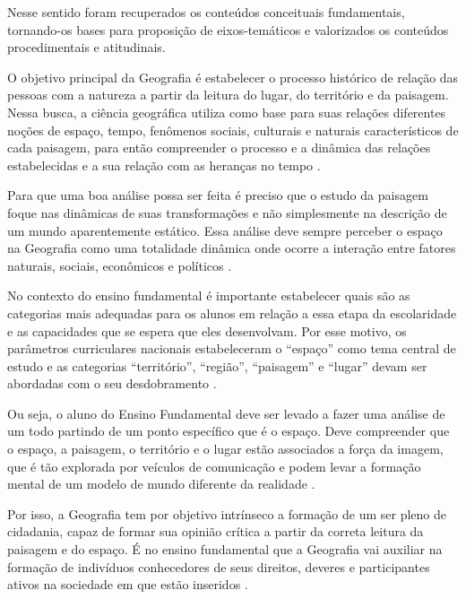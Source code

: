 \begin{refsection}
    Nesse sentido foram recuperados os conteúdos conceituais fundamentais, tornando-os bases para proposição de eixos-temáticos e valorizados os conteúdos procedimentais e atitudinais. 

    O objetivo principal da Geografia é estabelecer o processo histórico de relação das pessoas com a natureza a partir da leitura do lugar, do território e da paisagem. Nessa busca, a ciência geográfica utiliza como base para suas relações diferentes noções de espaço, tempo, fenômenos sociais, culturais e naturais característicos de cada paisagem, para então compreender o processo e a dinâmica das relações estabelecidas e a sua relação com as heranças no tempo \cite{ParâmetrosCurricularesGeografia2001}. 

    Para que uma boa análise possa ser feita é preciso que o estudo da paisagem foque nas dinâmicas de suas transformações e não simplesmente na descrição de um mundo aparentemente estático. Essa análise deve sempre perceber o espaço na Geografia como uma totalidade dinâmica onde ocorre a interação entre fatores naturais, sociais, econômicos e políticos \cite{ParâmetrosCurricularesGeografia2001}. 

    No contexto do ensino fundamental é importante estabelecer quais são as categorias mais adequadas para os alunos em relação a essa etapa da escolaridade e as capacidades que se espera que eles desenvolvam. Por esse motivo, os parâmetros curriculares nacionais estabeleceram o “espaço” como tema central de estudo e as categorias “território”, “região”, “paisagem” e “lugar” devam ser abordadas com o seu desdobramento \cite{ParâmetrosCurricularesGeografia2001}. 

    Ou seja, o aluno do Ensino Fundamental deve ser levado a fazer uma análise de um todo partindo de um ponto específico que é o espaço. Deve compreender que o espaço, a paisagem, o território e o lugar estão associados a força da imagem, que é tão explorada por veículos de comunicação e podem levar a formação mental de um modelo de mundo diferente da realidade \cite{TEIXEIRA2013Caminhar}.

    Por isso, a Geografia tem por objetivo intrínseco a formação de um ser pleno de cidadania, capaz de formar sua opinião crítica a partir da correta leitura da paisagem e do espaço. É no ensino fundamental que a Geografia vai auxiliar na formação de indivíduos conhecedores de seus direitos, deveres e participantes ativos na sociedade em que estão inseridos \cite{REGOAndCastrogiovanniAndKaercher2007Geografia}.  


\end{refsection}
